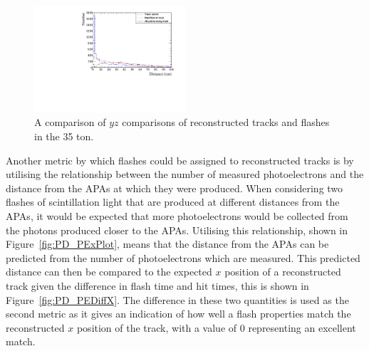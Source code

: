 \begin{figure}[h!]
  \centering
  \includegraphics[width=0.5\textwidth]{DiffTrackSeps}
  \caption[Matching tracks and flashes in the 35 ton using positions in the $yz$ plane]
          {A comparison of $yz$ comparisons of reconstructed tracks and flashes in the 35 ton.}
  \label{fig:PDYZDist}
\end{figure}

Another metric by which flashes could be assigned to reconstructed tracks is by utilising the relationship between the number of measured photoelectrons and the distance from the APAs at which they were produced. When considering two flashes of scintillation light that are produced at different distances from the APAs, it would be expected that more photoelectrons would be collected from the photons produced closer to the APAs. Utilising this relationship, shown in Figure~\ref{fig:PD_PExPlot}, means that the distance from the APAs can be predicted from the number of photoelectrons which are measured. This predicted distance can then be compared to the expected $x$ position of a reconstructed track given the difference in flash time and hit times, this is shown in Figure~\ref{fig:PD_PEDiffX}. The difference in these two quantities is used as the second metric as it gives an indication of how well a flash properties match the reconstructed $x$ position of the track, with a value of 0 representing an excellent match. \\

